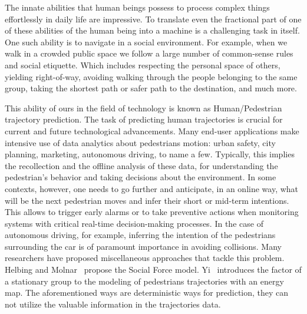 The innate abilities that human beings possess to process complex things effortlessly in daily life are impressive. To translate even the fractional part of one of these abilities of the human being into a machine is a challenging task in itself. One such ability is to navigate in a social environment. For example, when we walk in a crowded public space we follow a large number of common-sense rules and social etiquette. Which includes respecting the personal space of others, yielding right-of-way, avoiding walking through the people belonging to the same group, taking the shortest path or safer path to the destination, and much more.

This ability of ours in the field of technology is known as Human/Pedestrian trajectory prediction. The task of predicting human trajectories is crucial for current and future technological advancements. Many end-user applications make intensive use of data analytics about pedestrians motion: urban safety, city planning, marketing, autonomous driving, to name a few. Typically, this implies the recollection and the offline analysis of these data, for understanding the pedestrian's behavior and taking decisions about the environment. In some contexts, however, one needs to go further and anticipate, in an online way, what will be the next pedestrian moves and infer their short or mid-term intentions. This allows to trigger early alarms or to take preventive actions when monitoring systems with critical real-time decision-making processes. In the case of autonomous driving, for example, inferring the intention of the pedestrians surrounding the car is of paramount importance in avoiding collisions. Many researchers have proposed miscellaneous approaches that tackle this problem. Helbing and Molnar~\cite{Helbing95} propose the Social Force model. Yi~\cite{Yi15} introduces the factor of a stationary group to the modeling of pedestrians trajectories with an energy map. The aforementioned ways are deterministic ways for prediction, they can not utilize the valuable information in the trajectories data.

